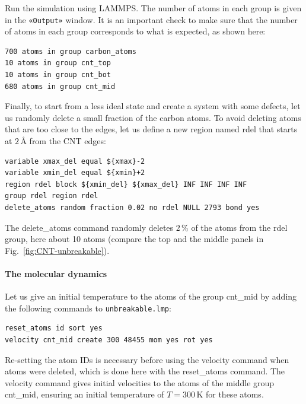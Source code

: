 \documentclass[9pt,tutorial]{livecoms}
\newcommand{\lmpcmd}[1]{\hspace{0pt}\colorbox{listing}{\textcolor{command}{\small{#1}}}\hspace{0pt}} %
\newcommand{\flecmd}[1]{\textcolor{command}{\texttt{#1}}} %
\newcommand{\guicmd}[1]{\textcolor{command}{\texttt{«#1»}}} %
\begin{document}
Run the simulation using LAMMPS.  The number of atoms in each group is given in
the \guicmd{Output} window.  It is an important check to make sure that the number
of atoms in each group corresponds to what is expected, as shown here:
\begin{lstlisting}
700 atoms in group carbon_atoms
10 atoms in group cnt_top
10 atoms in group cnt_bot
680 atoms in group cnt_mid
\end{lstlisting}

Finally, to start from a less ideal state and create a system with some defects,
let us randomly delete a small fraction of the carbon atoms.  To avoid deleting
atoms that are too close to the edges, let us define a new region named \lmpcmd{rdel}
that starts at $2\,\text{\AA{}}$ from the CNT edges:
\begin{lstlisting}
variable xmax_del equal ${xmax}-2
variable xmin_del equal ${xmin}+2
region rdel block ${xmin_del} ${xmax_del} INF INF INF INF
group rdel region rdel
delete_atoms random fraction 0.02 no rdel NULL 2793 bond yes
\end{lstlisting}
The \lmpcmd{delete\_atoms} command randomly deletes $2\,\%$ of the atoms from
the \lmpcmd{rdel} group, here about 10 atoms (compare the top
and the middle panels in Fig.~\ref{fig:CNT-unbreakable}).

\paragraph{The molecular dynamics}

Let us give an initial temperature to the atoms of the group \lmpcmd{cnt\_mid}
by adding the following commands to \flecmd{unbreakable.lmp}:
\begin{lstlisting}
reset_atoms id sort yes
velocity cnt_mid create 300 48455 mom yes rot yes
\end{lstlisting}
Re-setting the atom IDs is necessary before using the \lmpcmd{velocity} command
when atoms were deleted, which is done here with the \lmpcmd{reset\_atoms} command.
The \lmpcmd{velocity} command gives initial velocities to the atoms of the middle
group \lmpcmd{cnt\_mid}, ensuring an initial temperature of $T = 300\,\text{K}$
for these atoms.
\end{document}
